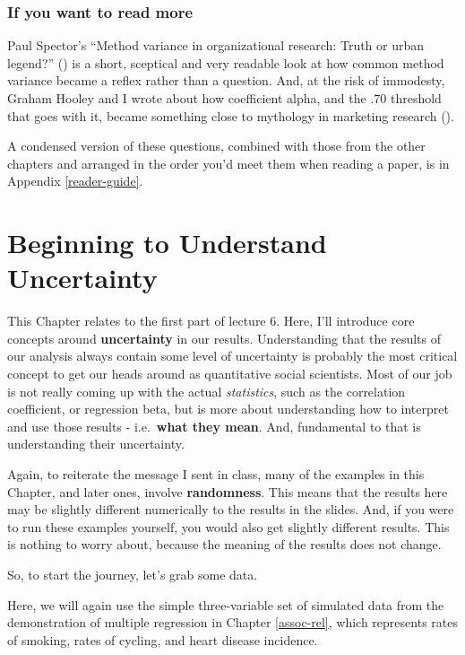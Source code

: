 \documentclass[
]{book}
\begin{document}
\subsection{If you want to read more}\label{if-you-want-to-read-more-3}

Paul Spector's ``Method variance in organizational research: Truth or urban legend?'' () is a short, sceptical and very readable look at how common method variance became a reflex rather than a question. And, at the risk of immodesty, Graham Hooley and I wrote about how coefficient alpha, and the .70 threshold that goes with it, became something close to mythology in marketing research ().

A condensed version of these questions, combined with those from the other chapters and arranged in the order you'd meet them when reading a paper, is in Appendix \ref{reader-guide}.

\chapter{Beginning to Understand Uncertainty}\label{uncertainty}

This Chapter relates to the first part of lecture 6. Here, I'll introduce core concepts around \textbf{uncertainty} in our results. Understanding that the results of our analysis always contain some level of uncertainty is probably the most critical concept to get our heads around as quantitative social scientists. Most of our job is not really coming up with the actual \emph{statistics}, such as the correlation coefficient, or regression beta, but is more about understanding how to interpret and use those results - i.e.~\textbf{what they mean}. And, fundamental to that is understanding their uncertainty.

Again, to reiterate the message I sent in class, many of the examples in this Chapter, and later ones, involve \textbf{randomness}. This means that the results here may be slightly different numerically to the results in the slides. And, if you were to run these examples yourself, you would also get slightly different results. This is nothing to worry about, because the meaning of the results does not change.

So, to start the journey, let's grab some data.

Here, we will again use the simple three-variable set of simulated data from the demonstration of multiple regression in Chapter \ref{assoc-rel}, which represents rates of smoking, rates of cycling, and heart disease incidence.
\end{document}
